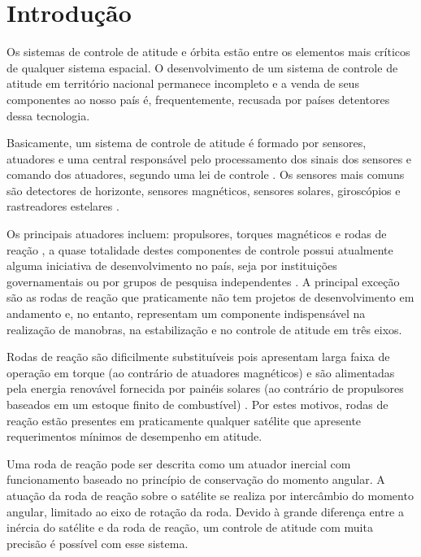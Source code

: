 \cleardoublepage

\pagestyle{fancy}


\chapter{Introdução}\label{intro}

Os sistemas de controle de atitude e órbita estão entre os elementos mais críticos de qualquer sistema espacial. O desenvolvimento de um sistema de controle de atitude em território nacional permanece incompleto \citep{Veloso2009} e a venda de seus componentes ao nosso país é, frequentemente, recusada por países detentores dessa tecnologia.

Basicamente, um sistema de controle de atitude é formado por sensores, atuadores e uma central responsável pelo processamento dos sinais dos sensores e comando dos atuadores, segundo uma lei de controle \citep{Rycroft1992}. Os sensores mais comuns são detectores de horizonte, sensores magnéticos, sensores solares, giroscópios e rastreadores estelares \citep{Larson1999}. 

Os principais atuadores incluem: propulsores, torques magnéticos e rodas de reação \citep{Larson1999}, a quase totalidade destes componentes de controle possui atualmente alguma iniciativa de desenvolvimento no país, seja por instituições governamentais ou por grupos de pesquisa independentes \citep{PresidenciaRepublica}. A principal exceção são as rodas de reação que praticamente não tem projetos de desenvolvimento em andamento e, no entanto, representam um componente indispensável na realização de manobras, na estabilização e no controle de atitude em três eixos. 

Rodas de reação são dificilmente substituíveis pois apresentam larga faixa de operação em torque (ao contrário de atuadores magnéticos) e são alimentadas pela energia renovável fornecida por painéis solares (ao contrário de propulsores baseados em um estoque finito de combustível) \citep{Ismail2010}. Por estes motivos, rodas de reação estão presentes em praticamente qualquer satélite que apresente requerimentos mínimos de desempenho em atitude.

Uma roda de reação pode ser descrita como um atuador inercial com funcionamento baseado no princípio de conservação do momento angular. A atuação da roda de reação sobre o satélite se realiza por intercâmbio do momento angular, limitado ao eixo de rotação da roda. Devido à grande diferença entre a inércia do satélite e da roda de reação, um controle de atitude com muita precisão é possível com esse sistema.

